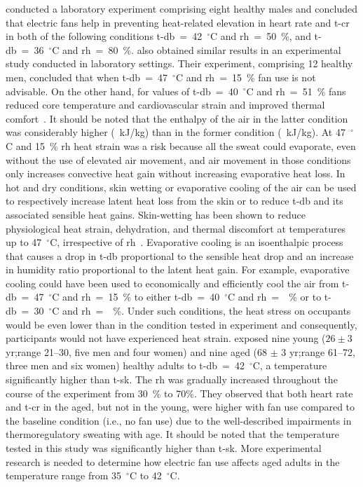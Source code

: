  conducted a laboratory experiment comprising eight healthy males and concluded that electric fans help in preventing heat-related elevation in heart rate and \ac{t-cr} in both of the following conditions \ac{t-db}~=~42~$^{\circ}$C and \ac{rh}~=~50~\%, and \ac{t-db}~=~36~$^{\circ}$C and \ac{rh}~=~80~\%.
 also obtained similar results in an experimental study conducted in laboratory settings.
Their experiment, comprising 12 healthy men, concluded that when \ac{t-db}~=~47~$^{\circ}$C and \ac{rh}~=~15~\% fan use is not advisable.
On the other hand, for values of \ac{t-db}~=~40~$^{\circ}$C and \ac{rh}~=~51~\% fans reduced core temperature and cardiovascular strain and improved thermal comfort~\cite{Morris2019}.
It should be noted that the enthalpy of the air in the latter condition was considerably higher (~kJ/kg) than in the former condition (~kJ/kg).
At 47~$^{\circ}$C and 15~\% \ac{rh} heat strain was a risk because all the sweat could evaporate, even without the use of elevated air movement, and air movement in those conditions only increases convective heat gain without increasing evaporative heat loss.
In hot and dry conditions, skin wetting or evaporative cooling of the air can be used to respectively increase latent heat loss from the skin or to reduce \ac{t-db} and its associated sensible heat gains.
Skin-wetting has been shown to reduce physiological heat strain, dehydration, and thermal discomfort at temperatures up to 47~$^{\circ}$C, irrespective of \ac{rh}~\cite{Morris2019a}.
Evaporative cooling is an isoenthalpic process that causes a drop in \ac{t-db} proportional to the sensible heat drop and an increase in humidity ratio proportional to the latent heat gain.
For example, evaporative cooling could have been used to economically and efficiently cool the air from \ac{t-db}~=~47~$^{\circ}$C and \ac{rh}~=~15~\% to either \ac{t-db}~=~40~$^{\circ}$C and \ac{rh}~=~~\% or to \ac{t-db}~=~30~$^{\circ}$C and \ac{rh}~=~~\%\@.
Under such conditions, the heat stress on occupants would be even lower than in the condition tested in  experiment and consequently, participants would not have experienced heat strain.
 exposed nine young ($26 \pm 3$ yr;\@ range 21--30, five men and four women) and nine aged (68 $\pm$ 3 yr;\@ range 61--72, three men and six women) healthy adults to \ac{t-db}~=~42~$^{\circ}$C, a temperature significantly higher than \ac{t-sk}.
The \ac{rh} was gradually increased throughout the course of the experiment from 30~\% to 70\%.
They observed that both heart rate and \ac{t-cr} in the aged, but not in the young, were higher with fan use compared to the baseline condition (i.e., no fan use) due to the well-described impairments in thermoregulatory sweating with age.
It should be noted that the temperature tested in this study was significantly higher than \ac{t-sk}.
More experimental research is needed to determine how electric fan use affects aged adults in the temperature range from 35~$^{\circ}$C to 42~$^{\circ}$C\@.

